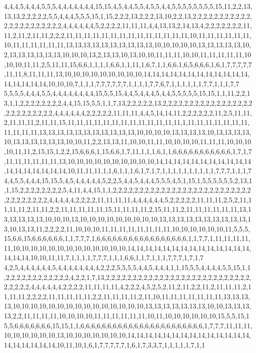 4,4,4,5,4,4,4,5,5,5,4,4,4,4,4,4,4,15,15,4,5,4,4,5,5,4,5,5,4,4,5,5,5,5,5,5,5,5,15,11,2,2,13,13,13,2,2,2,2,2,5,5,4,4,4,5,5,5,15,1,15,2,2,2,13,2,2,2,13,10,2,2,13,2,2,2,2,2,2,2,2,2,2,2,2,2,2,2,2,2,2,2,2,2,2,4,4,4,4,4,4,5,2,2,2,2,11,11,11,4,4,13,13,2,14,13,4,2,2,2,2,2,2,2,11,11,2,11,2,11,11,2,2,2,11,11,11,11,11,11,11,11,11,11,11,11,11,11,10,11,11,11,11,11,11,10,11,11,11,11,11,11,13,13,13,13,13,13,13,13,13,13,10,10,10,10,10,13,13,13,13,13,10,2,13,13,13,13,13,13,10,10,10,13,2,13,13,10,13,10,10,11,11,11,10,10,11,11,11,11,11,10,10,10,11,11,2,5,11,11,15,6,6,1,1,1,1,6,6,1,1,11,1,6,7,1,1,6,6,1,6,5,6,6,6,1,6,1,7,7,7,7,7,11,11,8,11,11,11,13,10,10,10,10,10,10,10,10,10,14,14,14,14,14,14,14,14,14,14,14,14,14,14,14,14,14,10,10,10,7,1,1,1,7,7,7,7,7,7,1,1,1,1,7,7,6,7,1,1,1,1,1,1,7,7,1,1,1,7,7
5,5,5,5,4,4,4,5,5,4,4,4,4,4,4,4,4,15,5,5,15,4,4,5,4,4,4,5,4,4,5,5,5,5,5,15,15,1,1,11,2,2,13,1,1,2,2,2,2,2,2,2,2,4,4,15,15,5,5,1,1,7,13,2,2,2,2,2,13,2,2,2,2,2,2,2,2,2,2,2,2,2,2,2,2,2,2,2,2,2,2,2,2,2,2,4,4,4,4,4,4,2,2,2,2,2,11,11,11,4,4,5,14,14,11,2,2,2,2,2,2,11,2,5,11,11,2,11,11,11,2,11,11,15,11,11,11,11,11,11,11,11,11,11,11,11,11,1,11,11,11,11,11,11,11,11,11,11,11,13,13,13,13,13,13,13,13,13,13,13,10,10,10,10,13,13,13,13,10,13,13,13,13,10,13,13,13,13,13,13,10,10,11,2,2,13,13,11,10,10,11,11,10,10,10,10,11,11,11,10,10,10,10,11,11,2,15,15,1,2,2,15,6,6,6,1,15,6,6,1,7,11,1,1,1,6,1,1,6,6,6,6,6,6,6,6,6,6,6,1,7,1,7,11,11,11,11,11,11,13,10,10,10,10,10,10,10,10,10,10,14,14,14,14,14,14,14,14,14,14,14,14,14,14,14,14,14,14,10,11,11,11,1,1,6,1,1,1,6,1,7,1,7,1,1,1,1,1,1,1,1,1,1,7,7,7,1,1,1,7
4,4,5,5,4,4,4,15,15,5,4,5,4,4,4,4,4,5,2,2,5,4,4,5,4,4,4,5,5,5,4,5,1,15,1,5,5,5,5,5,5,2,13,1,1,15,2,2,2,2,2,2,2,2,5,4,11,4,4,15,1,1,2,2,2,2,2,2,2,2,2,2,2,2,2,2,2,2,2,2,2,2,2,2,2,2,2,2,2,2,2,2,2,2,2,2,4,4,4,4,4,2,2,2,2,11,11,11,11,4,4,4,4,4,4,5,2,2,2,2,2,11,11,11,2,5,2,11,11,11,11,2,11,11,2,2,11,11,11,11,11,15,11,11,11,11,2,15,11,11,2,11,11,11,11,11,11,13,13,13,13,13,13,10,10,10,13,10,10,10,10,10,10,10,10,10,13,13,13,13,13,13,13,13,13,13,13,10,13,13,11,2,2,2,2,11,10,10,10,11,11,11,11,11,11,11,11,10,10,10,10,10,10,11,5,5,5,15,6,6,15,6,6,6,6,6,6,1,1,7,7,7,1,6,6,6,6,6,6,6,6,6,6,6,6,6,6,6,6,6,1,1,7,7,1,11,11,11,11,11,10,10,10,10,10,10,10,10,10,10,10,10,10,14,14,14,14,14,14,14,14,14,14,14,14,14,14,14,14,14,10,10,11,11,7,1,1,1,1,7,7,7,1,1,1,6,6,1,1,7,1,1,1,7,7,7,1,7,1,7
4,2,5,4,4,4,4,4,4,5,4,4,4,4,4,4,4,4,2,2,2,5,5,5,5,4,4,5,4,4,4,1,1,15,5,5,4,4,4,4,5,5,15,1,1,2,2,2,2,2,2,2,2,2,2,2,2,4,2,2,1,7,13,2,2,2,2,2,2,2,2,2,2,2,2,2,2,2,2,2,2,2,2,2,2,2,2,2,2,2,2,2,2,2,2,4,4,4,4,4,4,2,2,2,2,11,11,11,11,4,2,2,2,4,5,2,5,2,11,2,11,2,2,11,2,11,11,11,2,11,11,11,2,2,2,2,11,11,11,11,11,2,2,11,11,11,11,2,11,10,11,11,11,11,11,11,11,13,13,13,13,10,10,10,10,10,10,10,10,10,10,10,10,10,10,10,13,13,13,13,13,13,13,10,10,13,13,13,13,2,2,11,11,11,11,10,10,10,10,11,11,11,11,11,11,10,11,10,10,10,10,10,10,15,5,5,15,15,5,6,6,6,6,6,6,6,15,15,1,1,6,6,6,6,6,6,6,6,6,6,6,6,6,6,6,6,6,6,6,6,6,6,6,1,7,7,7,11,11,11,10,10,10,10,10,10,13,10,10,10,10,10,10,10,14,14,14,14,14,14,14,14,14,14,14,14,14,14,14,14,14,14,14,14,10,11,10,1,6,1,7,7,7,7,7,1,6,1,7,3,3,7,1,1,1,1,1,7,1,1
